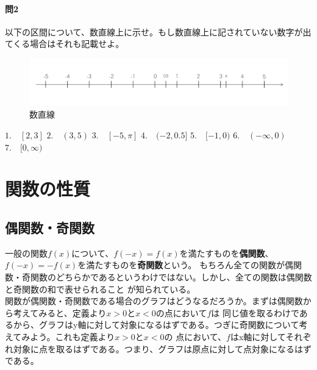 \documentclass[a4j,dvipdfmx]{jsarticle}
\begin{document}
        \paragraph{問2}以下の区間について、数直線上に示せ。もし数直線上に記されていない数字が出てくる場合はそれも記載せよ。
            \begin{figure}[h]
                \centering
                \includegraphics[keepaspectratio,scale=0.6]{img/QuuNote/NumLine_1.png}
                \caption{数直線}
            \end{figure}

            $1.\quad [2,3]$\hspace{3mm}
            $2.\quad (3,5)$\hspace{3mm}
            $3.\quad [-5,\pi]$\hspace{3mm}
            $4.\quad (-2,0.5]$\hspace{3mm}
            $5.\quad [-1,0)$\hspace{3mm}
            $6.\quad (-\infty,0)$\hspace{3mm}
            $7.\quad [0,\infty)$\hspace{3mm}
        \clearpage
        
        \section{関数の性質}
            \subsection{偶関数・奇関数}
                一般の関数$f(x)$について、$f(-x)=f(x)$を満たすものを\textbf{偶関数}、$f(-x)=-f(x)$を満たすものを\textbf{奇関数}という。
                もちろん全ての関数が偶関数・奇関数のどちらかであるというわけではない。しかし、全ての関数は偶関数と奇関数の和で表せられること
                が知られている。\\

                関数が偶関数・奇関数である場合のグラフはどうなるだろうか。まずは偶関数から考えてみると、定義より$x>0$と$x<0$の点において$f$は
                同じ値を取るわけであるから、グラフはy軸に対して対象になるはずである。つぎに奇関数について考えてみよう。これも定義より$x>0$と$x<0$の
                点において、$f$はx軸に対してそれぞれ対象に点を取るはずである。つまり、グラフは原点に対して点対象になるはずである。\\
\end{document}
